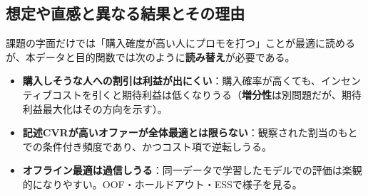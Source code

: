 \documentclass[11pt,a4paper]{article}
\begin{document}
\subsection{想定や直感と異なる結果とその理由}
課題の字面だけでは「購入確度が高い人にプロモを打つ」ことが最適に読めるが、本データと目的関数では次のように\textbf{読み替え}が必要である。
\begin{itemize}
  \item \textbf{購入しそうな人への割引は利益が出にくい}：購入確率が高くても、インセンティブコストを引くと期待利益は低くなりうる（\textbf{増分性}は別問題だが、期待利益最大化はその方向を示す）。
  \item \textbf{記述CVRが高いオファーが全体最適とは限らない}：観察された割当のもとでの条件付き頻度であり、かつコスト項で逆転しうる。
  \item \textbf{オフライン最適は過信しうる}：同一データで学習したモデルでの評価は楽観的になりやすい。OOF・ホールドアウト・ESSで様子を見る。
\end{itemize}
\end{document}
